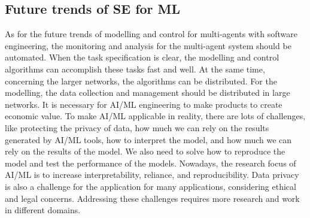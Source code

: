 \documentclass[11pt]{article}
\begin{document}
\subsection*{Future trends of SE for ML }
As for the future trends of modelling and control for multi-agents with software engineering, the monitoring and analysis for the multi-agent system should be automated. When the task specification is clear, the modelling and control algorithms can accomplish these tasks fast and well. At the same time, concerning the larger networks, the algorithms can be distributed. For the modelling, the data collection and management should be distributed in large networks. It is necessary for AI/ML engineering to make products to create economic value. To make AI/ML applicable in reality, there are lots of challenges, like protecting the privacy of data, how much we can rely on the results generated by AI/ML tools, how to interpret the model, and how much we can rely on the results of the model. We also need to solve how to reproduce the model and test the performance of the models. Nowadays, the research focus of AI/ML is to increase interpretability, reliance, and reproducibility. Data privacy is also a challenge for the application for many applications, considering ethical and legal concerns. Addressing these challenges requires more research and work in different domains. 


% 
\newpage
\printbibliography
\end{document}
